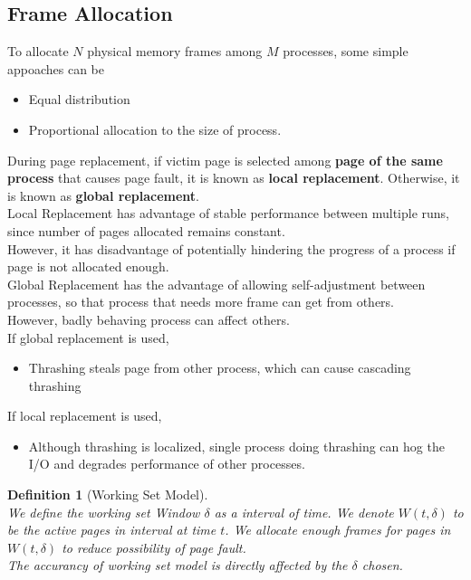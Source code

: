 \documentclass[12pt]{article}
\newtheorem{definition}{Definition}[section]
\theoremstyle{definition}
\begin{document}
\subsection{Frame Allocation}
To allocate $N$ physical memory frames among $M$ processes, some simple appoaches can be
\begin{itemize}
  \item Equal distribution
  \item Proportional allocation to the size of process.
\end{itemize}
During page replacement, if victim page is selected among \textbf{page of the same process} that causes page fault, it is known as \textbf{local replacement}. Otherwise, it is known as \textbf{global replacement}.\\
Local Replacement has advantage of stable performance between multiple runs, since number of pages allocated remains constant.\\However, it has disadvantage of potentially hindering the progress of a process if page is not allocated enough.\\
Global Replacement has the advantage of allowing self-adjustment between processes, so that process that needs more frame can get from others.\\ However, badly behaving process can affect others.\\
If global replacement is used, 
\begin{itemize}
  \item Thrashing steals page from other process, which can cause cascading thrashing
\end{itemize}
If local replacement is used,
\begin{itemize}
  \item Although thrashing is localized, single process doing thrashing can hog the I/O and degrades performance of other processes.
\end{itemize}
\begin{definition}[Working Set Model]
\hfill\\\normalfont We define the working set Window $\delta$ as a interval of time. We denote $W(t,\delta)$ to be the active pages in interval at time $t$. We allocate enough frames for pages in $W(t,\delta)$ to reduce possibility of page fault.\\
The accurancy of working set model is directly affected by the $\delta$ chosen.
\end{definition}
\end{document}
